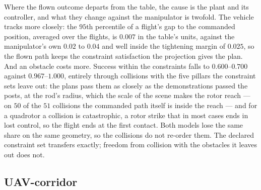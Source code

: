 Where the flown outcome departs from the table, the cause is the plant and its controller, and what they
change against the manipulator is twofold. The vehicle tracks more
closely: the $95$th percentile of a flight's gap to the commanded position, averaged over the flights, is
$0.007$ in the table's units, against the
manipulator's own $0.02$ to $0.04$ and well inside the tightening margin of $0.025$, so the flown path keeps
the constraint satisfaction the projection gives the plan. And an obstacle costs more. Success within the
constraints falls to $0.600$--$0.700$ against $0.967$--$1.000$, entirely through collisions with the five
pillars the constraint sets leave out: the plans pass them as closely as the demonstrations passed the posts,
at the rod's radius, which the scale of the scene makes the rotor reach --- on $50$ of the $51$ collisions the
commanded path itself is inside the reach --- and for a quadrotor a collision is catastrophic, a rotor strike
that in most cases ends in lost control, so the flight ends at the first contact. Both models lose the same
share on the same geometry, so the collisions do not re-order them. The declared constraint set transfers
exactly; freedom from collision with the obstacles it leaves out does not.

\subsection{UAV-corridor}\label{sec:res:uav:corridor}


